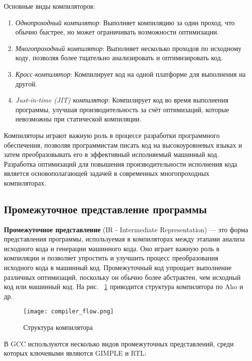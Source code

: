 Основные виды компиляторов:
\begin{enumerate}
    \item \textit{Однопроходный компилятор}: Выполняет компиляцию за один проход, что обычно быстрее, но может ограничивать возможности оптимизации.
    \item \textit{Многопроходный компилятор}: Выполняет несколько проходов по исходному коду, позволяя более тщательно анализировать и оптимизировать код.
    \item \textit{Кросс-компилятор}: Компилирует код на одной платформе для выполнения на другой.
    \item \textit{Just-in-time (JIT) компилятор}: Компилирует код во время выполнения программы, улучшая производительность за счёт оптимизаций, которые невозможны при статической компиляции.
\end{enumerate}

Компиляторы играют важную роль в процессе разработки программного обеспечения, позволяя программистам писать код на высокоуровневых языках и затем преобразовывать его в эффективный исполняемый машинный код. Разработка оптимизаций для повышения производительности исполнения кода является основополагающей задачей в современных многопроходных компиляторах.

\subsection{Промежуточное представление программы}

\textbf{Промежуточное представление} (IR - Intermediate Representation) — это форма представления программы, используемая в компиляторах между этапами анализа исходного кода и генерации машинного кода. Оно играет важную роль в компиляции и позволяет упростить и улучшить процесс преобразования исходного кода в машинный код. Промежуточный код упрощает выполнение различных оптимизаций, поскольку он обычно более абстрактен, чем исходный код или машинный код.  На рис. ~\ref{flow} приводится структура
компилятора по Aho и др. \cite{aho2006compilers}

\begin{figure}[!htb]
    \centering
    \texttt{[image: compiler\_flow.png]}\\
    \caption{Структура компилятора}
    \label{flow}
\end{figure}

В GCC используются несколько видов промежуточных представлений, среди которых ключевыми являются GIMPLE и RTL:

